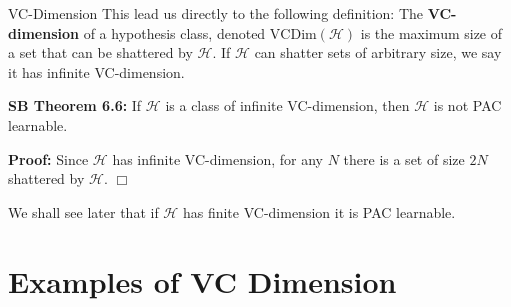 \documentclass[10pt, table, dvipsnames, handout]{beamer}
\newcommand{\cH}{\ensuremath{\mathcal{H}}}
\begin{document}
\begin{frame}[fragile]{VC-Dimension}
This lead us directly to the following definition: The \textbf{VC-dimension} of a hypothesis class, denoted $\text{VCDim}(\cH)$ is the maximum size of a set that can be shattered by $\cH$. If $\cH$ can shatter sets of arbitrary size, we say it has infinite VC-dimension. \pause\newline

\textbf{SB Theorem 6.6:} If $\cH$ is a class of infinite VC-dimension, then $\cH$ is not PAC learnable. \pause\newline

\textbf{Proof:} Since $\cH$ has infinite VC-dimension, for any $N$ there is a set of size $2N$ shattered by $\cH$. $\Box$ \pause \newline

We shall see later that if $\cH$ has finite VC-dimension it is PAC learnable.
\end{frame}





\section{Examples of VC Dimension}
\end{document}
